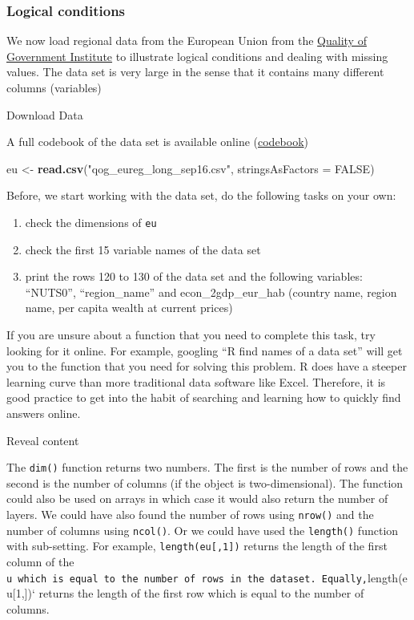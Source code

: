 \documentclass[]{article}
\newenvironment{Shaded}{\begin{snugshade}}{\end{snugshade}}
\newcommand{\DataTypeTok}[1]{\textcolor[rgb]{0.13,0.29,0.53}{#1}}
\newcommand{\KeywordTok}[1]{\textcolor[rgb]{0.13,0.29,0.53}{\textbf{#1}}}
\newcommand{\NormalTok}[1]{#1}
\newcommand{\OtherTok}[1]{\textcolor[rgb]{0.56,0.35,0.01}{#1}}
\newcommand{\StringTok}[1]{\textcolor[rgb]{0.31,0.60,0.02}{#1}}
\providecommand{\tightlist}{%
  \setlength{\itemsep}{0pt}\setlength{\parskip}{0pt}}
\begin{document}
\hypertarget{logical-conditions}{%
\subsubsection{Logical conditions}\label{logical-conditions}}

We now load regional data from the European Union from the \href{http://qog.pol.gu.se/}{Quality of Government Institute} to illustrate logical conditions and dealing with missing values. The data set is very large in the sense that it contains many different columns (variables)

Download Data

A full codebook of the data set is available online (\href{https://www.qogdata.pol.gu.se/data/qog_eureg_sep16.pdf}{codebook})

\begin{Shaded}
\begin{Highlighting}[]
\NormalTok{eu <-}\StringTok{ }\KeywordTok{read.csv}\NormalTok{(}\StringTok{"qog_eureg_long_sep16.csv"}\NormalTok{, }\DataTypeTok{stringsAsFactors =} \OtherTok{FALSE}\NormalTok{)}
\end{Highlighting}
\end{Shaded}

Before, we start working with the data set, do the following tasks on your own:

\begin{enumerate}
\def\labelenumi{\arabic{enumi}.}
\tightlist
\item
  check the dimensions of \texttt{eu}
\item
  check the first 15 variable names of the data set
\item
  print the rows 120 to 130 of the data set and the following variables: ``NUTS0'', ``region\_name'' and econ\_2gdp\_eur\_hab (country name, region name, per capita wealth at current prices)
\end{enumerate}

If you are unsure about a function that you need to complete this task, try looking for it online. For example, googling ``R find names of a data set'' will get you to the function that you need for solving this problem. R does have a steeper learning curve than more traditional data software like Excel. Therefore, it is good practice to get into the habit of searching and learning how to quickly find answers online.

Reveal content

The \texttt{dim()} function returns two numbers. The first is the number of rows and the second is the number of columns (if the object is two-dimensional). The function could also be used on arrays in which case it would also return the number of layers. We could have also found the number of rows using \texttt{nrow()} and the number of columns using \texttt{ncol()}. Or we could have used the \texttt{length()} function with sub-setting. For example, \texttt{length(eu{[},1{]})} returns the length of the first column of the \texttt{u\ which\ is\ equal\ to\ the\ number\ of\ rows\ in\ the\ dataset.\ Equally,}length(eu{[}1,{]})` returns the length of the first row which is equal to the number of columns.
\end{document}
